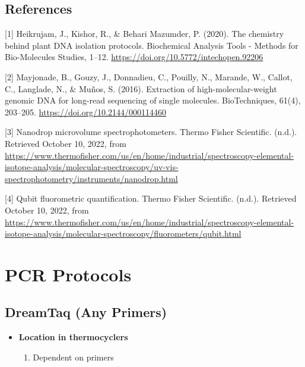 \documentclass[
]{book}
\providecommand{\tightlist}{%
  \setlength{\itemsep}{0pt}\setlength{\parskip}{0pt}}
\begin{document}
\hypertarget{references}{%
\section{\texorpdfstring{\textbf{References}~}{References~}}\label{references}}

{[}1{]} Heikrujam, J., Kishor, R., \& Behari Mazumder, P. (2020). The chemistry behind plant DNA isolation protocols. Biochemical Analysis Tools - Methods for Bio-Molecules Studies, 1--12. \url{https://doi.org/10.5772/intechopen.92206}~

{[}2{]} Mayjonade, B., Gouzy, J., Donnadieu, C., Pouilly, N., Marande, W., Callot, C., Langlade, N., \& Muños, S. (2016). Extraction of high-molecular-weight genomic DNA for long-read sequencing of single molecules. BioTechniques, 61(4), 203--205. \url{https://doi.org/10.2144/000114460}~

{[}3{]} Nanodrop microvolume spectrophotometers. Thermo Fisher Scientific. (n.d.). Retrieved October 10, 2022, from \url{https://www.thermofisher.com/us/en/home/industrial/spectroscopy-elemental-isotope-analysis/molecular-spectroscopy/uv-vis-spectrophotometry/instruments/nanodrop.html}~

{[}4{]} Qubit fluorometric quantification. Thermo Fisher Scientific. (n.d.). Retrieved October 10, 2022, from \url{https://www.thermofisher.com/us/en/home/industrial/spectroscopy-elemental-isotope-analysis/molecular-spectroscopy/fluorometers/qubit.html}

\hypertarget{pcr-protocols}{%
\chapter{PCR Protocols}\label{pcr-protocols}}

\hypertarget{dreamtaq-any-primers}{%
\section{DreamTaq (Any Primers)}\label{dreamtaq-any-primers}}

\begin{itemize}
\tightlist
\item
  \textbf{Location in thermocyclers}

  \begin{enumerate}
  \def\labelenumi{\arabic{enumi}.}
  \tightlist
  \item
    Dependent on primers
  \end{enumerate}
\end{itemize}
\end{document}
